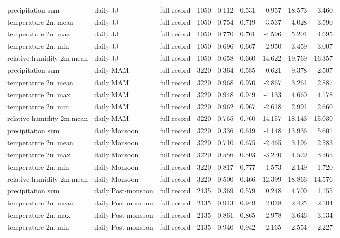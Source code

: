 \begin{landscape}
\begin{longtable}{p{}p{}p{}r r r r r r}
precipitation sum & daily JJ & full record & 1050 & 0.112 & 0.531 & -0.957 & 18.573 & 3.460 \\
temperature 2m mean & daily JJ & full record & 1050 & 0.754 & 0.719 & -3.537 & 4.028 & 3.590 \\
temperature 2m max & daily JJ & full record & 1050 & 0.770 & 0.761 & -4.596 & 5.201 & 4.695 \\
temperature 2m min & daily JJ & full record & 1050 & 0.696 & 0.667 & -2.950 & 3.459 & 3.007 \\
relative humidity 2m mean & daily JJ & full record & 1050 & 0.658 & 0.660 & 14.622 & 19.769 & 16.357 \\
precipitation sum & daily MAM & full record & 3220 & 0.364 & 0.585 & 0.621 & 9.378 & 2.507 \\
temperature 2m mean & daily MAM & full record & 3220 & 0.968 & 0.970 & -2.867 & 3.261 & 2.887 \\
temperature 2m max & daily MAM & full record & 3220 & 0.948 & 0.949 & -4.133 & 4.660 & 4.178 \\
temperature 2m min & daily MAM & full record & 3220 & 0.962 & 0.967 & -2.618 & 2.991 & 2.660 \\
relative humidity 2m mean & daily MAM & full record & 3220 & 0.765 & 0.760 & 14.157 & 18.143 & 15.030 \\
precipitation sum & daily Monsoon & full record & 3220 & 0.336 & 0.619 & -1.148 & 13.936 & 5.601 \\
temperature 2m mean & daily Monsoon & full record & 3220 & 0.710 & 0.675 & -2.465 & 3.196 & 2.583 \\
temperature 2m max & daily Monsoon & full record & 3220 & 0.556 & 0.503 & -3.270 & 4.529 & 3.565 \\
temperature 2m min & daily Monsoon & full record & 3220 & 0.817 & 0.777 & -1.573 & 2.149 & 1.720 \\
relative humidity 2m mean & daily Monsoon & full record & 3220 & 0.500 & 0.466 & 12.399 & 18.866 & 14.576 \\
precipitation sum & daily Post-monsoon & full record & 2135 & 0.369 & 0.579 & 0.248 & 4.709 & 1.155 \\
temperature 2m mean & daily Post-monsoon & full record & 2135 & 0.943 & 0.949 & -2.038 & 2.425 & 2.104 \\
temperature 2m max & daily Post-monsoon & full record & 2135 & 0.861 & 0.865 & -2.978 & 3.646 & 3.134 \\
temperature 2m min & daily Post-monsoon & full record & 2135 & 0.940 & 0.942 & -2.165 & 2.554 & 2.227 \\

\end{longtable}
\end{landscape}
